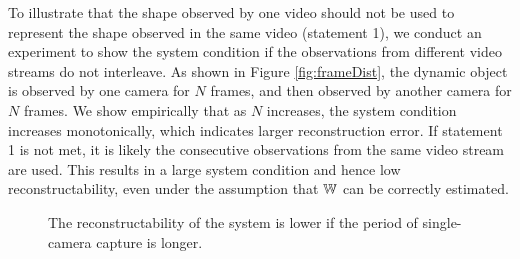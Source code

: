 To illustrate that the shape observed by one video should not be used to represent the shape observed in the same video (statement 1), we conduct an experiment to show the system condition if the observations from different video streams do not interleave. As shown in Figure \ref{fig:frameDist}, the dynamic object is observed by one camera for $N$ frames, and then observed by another camera for $N$ frames. We show empirically that as $N$ increases, the system condition increases monotonically, which indicates larger reconstruction error. If statement 1 is not met, it is likely the consecutive observations from the same video stream are used. This results in a large system condition and hence low reconstructability, even under the assumption that $\mathbb W$ can be correctly estimated.

\begin{figure}
\centering
{}
\caption{The reconstructability of the system is lower if the period of single-camera capture is longer.}
\end{figure}

